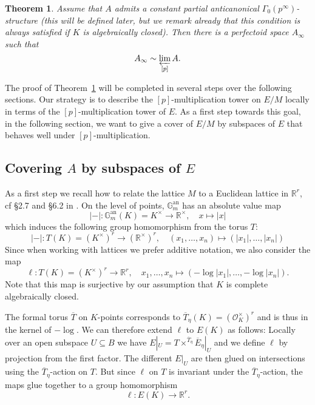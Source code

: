 \documentclass[11pt,oneside]{amsart}
\newtheorem{theorem}{Theorem}[section]
\theoremstyle{definition}
\theoremstyle{remark}
\begin{document}
	\begin{theorem}\label{main theorem}
		Assume that $A$ admits a constant partial anticanonical $\Gamma_0(p^\infty)$-structure (this will be defined later, but we remark already that this condition is always satisfied if $K$ is algebraically closed). Then there is a perfectoid space $A_\infty$ such that
				\[A_\infty \sim \varprojlim_{[p]} A.\]
	\end{theorem}
	
	The proof of Theorem~\ref{main theorem} will be completed in several steps over the following sections. Our strategy is to describe the $[p]$-multiplication tower on $E/M$ locally in terms of the $[p]$-multiplication tower of $E$.
	As a first step towards this goal, in the following section, we want to give a cover of $E/M$ by subspaces of $E$ that behaves well under $[p]$-multiplication.
	
	\subsection{Covering $A$ by subspaces of $E$}
	As a first step we recall how to relate the lattice $M$ to a Euclidean lattice in $\mathbb R^r$, cf \S2.7 and \S6.2 in  \cite{rigid geometry of curves}. On the level of points, $\mathbb{G}_m^{\operatorname{an}}$ has an absolute value map
	\[|-|:\mathbb{G}_m^{\operatorname{an}}(K)=K^\times\rightarrow \mathbb R^\times, \quad x\mapsto |x|\]
	which induces the following group homomorphism from the torus $T$:
	\[|-|:T(K)=(K^\times)^r\rightarrow (\mathbb R^\times)^r, \quad (x_1,\dots,x_n)\mapsto (|x_1|,\dots,|x_n|)\]
	Since when working with lattices we prefer additive notation, we also consider the map
	\[\ell:T(K)=(K^\times)^r\rightarrow \mathbb R^r, \quad x_1,\dots,x_n\mapsto (-\log |x_1|,\dots,-\log |x_n|).\]
	Note that this map is surjective by our assumption that $K$ is complete algebraically closed.
	
		The formal torus $\overline{T}$ on $K$-points corresponds to $\overline{T}_\eta(K) = (\mathcal O_K^\times)^r$ and is thus in the kernel of $-\log$. We can therefore extend $\ell$ to $E(K)$ as follows: Locally over an open subspace $U\subseteq B$ we have $E|_U = T\times^{\overline{T}_\eta}\overline{E}_\eta|_{U}$ and we define $\ell$ by projection from the first factor. The different $E|_U$ are then glued on intersections using the $\overline{T}_\eta$-action on $T$. But since $\ell$ on $T$ is invariant under the $\overline{T}_\eta$-action, the maps glue together to a group homomorphism 
	\[\ell:E(K)\rightarrow \mathbb R^r.\]
	
\end{document}
